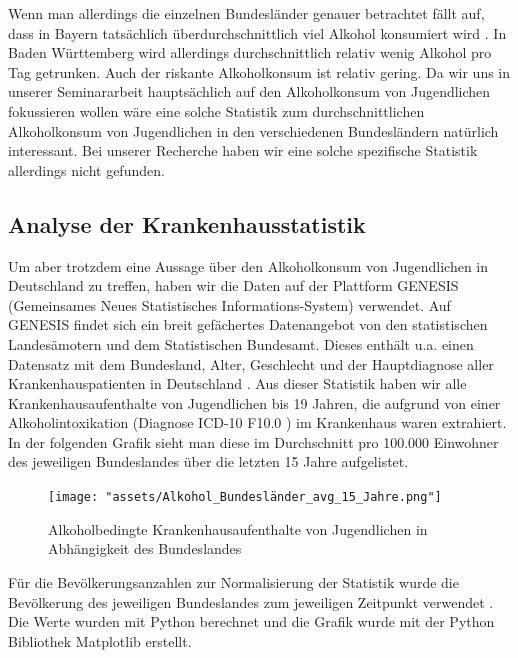 \documentclass[12pt]{article}
\begin{document}
Wenn man allerdings die einzelnen Bundesländer genauer betrachtet fällt auf, dass in Bayern tatsächlich überdurchschnittlich viel Alkohol konsumiert wird \autocite[778]{kraus_einfluss_2001}. In Baden Württemberg wird allerdings durchschnittlich relativ wenig Alkohol pro Tag getrunken. Auch der riskante Alkoholkonsum ist relativ gering. Da wir uns in unserer Seminararbeit hauptsächlich auf den Alkoholkonsum von Jugendlichen fokussieren wollen wäre eine solche Statistik zum durchschnittlichen Alkoholkonsum von Jugendlichen in den verschiedenen Bundesländern natürlich interessant. Bei unserer Recherche haben wir eine solche spezifische Statistik allerdings nicht gefunden.\\
\subsection{Analyse der Krankenhausstatistik}

Um aber trotzdem eine Aussage über den Alkoholkonsum von Jugendlichen in Deutschland zu treffen, haben wir die Daten auf der Plattform GENESIS (Gemeinsames Neues Statistisches Informations-System) \autocite{noauthor_statistisches_nodate} verwendet. Auf GENESIS findet sich ein breit gefächertes Datenangebot von den statistischen Landesämotern und dem Statistischen Bundesamt. Dieses enthält u.a. einen Datensatz mit dem Bundesland, Alter, Geschlecht und der Hauptdiagnose aller Krankenhauspatienten in Deutschland \autocite{noauthor_genesis_nodate}. Aus dieser Statistik haben wir alle Krankenhausaufenthalte von Jugendlichen bis 19 Jahren, die aufgrund von einer Alkoholintoxikation (Diagnose ICD-10 F10.0 \autocite{noauthor_icd-10-code_nodate}) im Krankenhaus waren extrahiert. In der folgenden Grafik sieht man diese im Durchschnitt pro 100.000 Einwohner des jeweiligen Bundeslandes über die letzten 15 Jahre aufgelistet.

\begin{figure}[H]
    \centering
    \texttt{[image: "assets/Alkohol\_Bundesländer\_avg\_15\_Jahre.png"]}
    \caption{Alkoholbedingte Krankenhausaufenthalte von Jugendlichen in Abhängigkeit des Bundeslandes}
    \label{fig:Krankenhausaufenthalte_1}
\end{figure}

Für die Bevölkerungsanzahlen zur Normalisierung der Statistik wurde die Bevölkerung des jeweiligen Bundeslandes zum jeweiligen Zeitpunkt verwendet \autocite{noauthor_statistisches_2024}. Die Werte wurden mit Python berechnet und die Grafik wurde mit der Python Bibliothek Matplotlib \autocite{noauthor_matplotlib_nodate} erstellt. 
\end{document}
